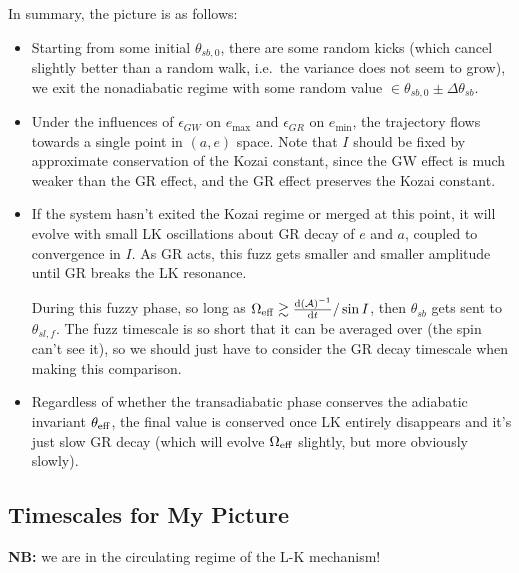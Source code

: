 \documentclass[11pt,
        usenames, %
        dvipsnames %
    ]{article}
\newcommand*{\rd}[2]{\frac{\mathrm{d}#1}{\mathrm{d}#2}}
\begin{document}
In summary, the picture is as follows:
\begin{itemize}
    \item Starting from some initial $\theta_{sb, 0}$, there are some random
        kicks (which cancel slightly better than a random walk, i.e.\ the
        variance does not seem to grow), we exit the nonadiabatic regime with
        some random value $\in \theta_{sb, 0} \pm \Delta \theta_{sb}$.

    \item Under the influences of $\epsilon_{GW}$ on $e_{\max}$ and
        $\epsilon_{GR}$ on $e_{\min}$, the trajectory flows towards a single
        point in $(a, e)$ space. Note that $I$ should be fixed by approximate
        conservation of the Kozai constant, since the GW effect is much weaker
        than the GR effect, and the GR effect preserves the Kozai constant.

    \item If the system hasn't exited the Kozai regime or merged at this point,
        it will evolve with small LK oscillations about GR decay of $e$ and $a$,
        coupled to convergence in $I$. As GR acts, this fuzz gets smaller and
        smaller amplitude until GR breaks the LK resonance.

        During this fuzzy phase, so long as $\Omega_{\rm eff} \gtrsim
        \rd{(\mathcal{A})^{-1}}{t}/\sin I$, then $\theta_{sb}$ gets sent to
        $\theta_{sl, f}$. The fuzz timescale is so short that it can be averaged
        over (the spin can't see it), so we should just have to consider the GR
        decay timescale when making this comparison.

    \item Regardless of whether the transadiabatic phase conserves the adiabatic
        invariant $\theta_{\rm eff}$, the final value is conserved once LK
        entirely disappears and it's just slow GR decay (which will evolve
        $\Omega_{\rm eff}$ slightly, but more obviously slowly).
\end{itemize}

\subsection{Timescales for My Picture}

\textbf{NB:} we are in the circulating regime of the L-K mechanism!
\end{document}
